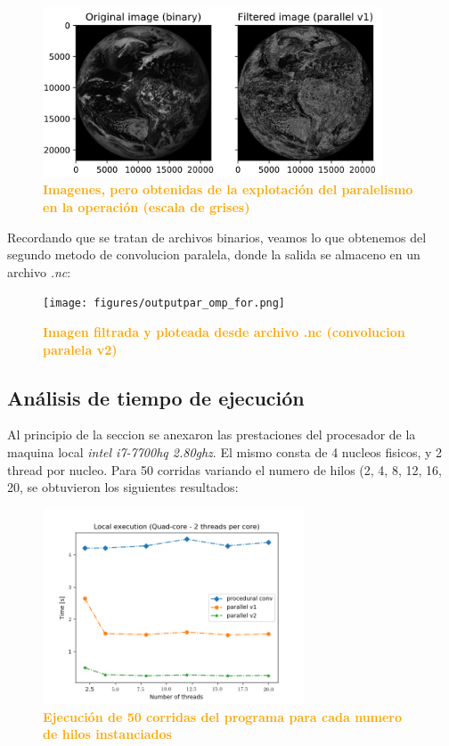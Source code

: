 \documentclass{article}
\begin{document}
   \begin{figure}[H]
    \centering
      \includegraphics[width=0.9\textwidth]{figures/parallel1_2.jpg}
       \centering
       \caption{\textbf{\textcolor{Orange}{Imagenes, pero obtenidas de la explotación del paralelismo en la operación (escala de grises)}}}
    \end{figure}
    
    Recordando que se tratan de archivos binarios, veamos lo que obtenemos del segundo metodo de convolucion paralela, donde la salida se almaceno en un archivo \textit{.nc}:
  \begin{figure}[H]
    \centering
      \texttt{[image: figures/outputpar\_omp\_for.png]}
       \centering
       \caption{\textbf{\textcolor{Orange}{Imagen filtrada y ploteada desde archivo .nc (convolucion paralela v2)}}}
    \end{figure}
    

\subsection{Análisis de tiempo de ejecución}
Al principio de la seccion se anexaron las prestaciones del procesador de la maquina local \textit{intel i7-7700hq 2.80ghz}. El mismo consta de 4 nucleos fisicos, y 2 thread por nucleo. Para 50 corridas variando el numero de hilos (2, 4, 8, 12, 16, 20, se obtuvieron los
siguientes resultados:\\

  \begin{figure}[H]
    \centering
      \includegraphics[width=0.69\textwidth]{figures/time_it.png}
       \centering
       \caption{\textbf{\textcolor{Orange}{Ejecución de 50 corridas del programa para cada numero de hilos instanciados}}}
    \end{figure}   
\end{document}
